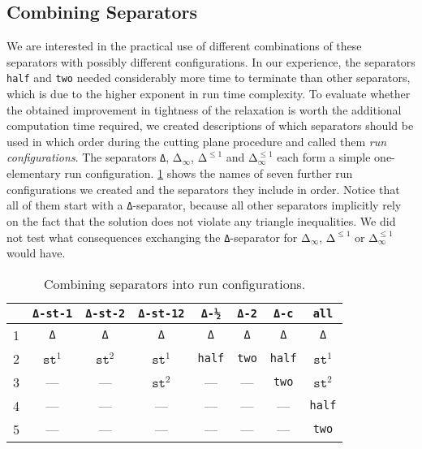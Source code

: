\subsection{Combining Separators}\label{subsec:run_configurations}
We are interested in the practical use of different combinations of these separators with possibly different configurations.
In our experience, the separators \texttt{half} and \texttt{two} needed considerably more time to terminate than other separators, which is due to the higher exponent in run time complexity.
To evaluate whether the obtained improvement in tightness of the relaxation is worth the additional computation time required,
we created descriptions of which separators should be used in which order during the cutting plane procedure and called them \textit{run configurations}.
The separators \texttt{Δ}, $\texttt{Δ}_{\infty}$, $\texttt{Δ}^{\leq 1}$ and $\texttt{Δ}_{\infty}^{\leq 1}$ each form a simple one-elementary run configuration.
\cref{tab:run_configurations} shows the names of seven further run configurations we created and the separators they include in order.
Notice that all of them start with a \texttt{Δ}-separator, because all other separators implicitly rely on the fact that the solution does not violate any triangle inequalities.
We did not test what consequences exchanging the \texttt{Δ}-separator for $\texttt{Δ}_{\infty}$, $\texttt{Δ}^{\leq 1}$ or $\texttt{Δ}_{\infty}^{\leq 1}$ would have.
\begin{table}
\centering
\begin{tabular}{lccccccc}
\toprule
  & \texttt{Δ-st-1} & \texttt{Δ-st-2} & \texttt{Δ-st-12}	& \texttt{Δ-½}	& \texttt{Δ-2} 	& \texttt{Δ-c}	& \texttt{all}  	\\
\midrule
1 & \texttt{Δ}      & \texttt{Δ}      & \texttt{Δ}      	& \texttt{Δ}	& \texttt{Δ}	& \texttt{Δ}	& \texttt{Δ} 		\\
2 & $\texttt{st}^1$ & $\texttt{st}^2$ & $\texttt{st}^1$ 	& \texttt{half}	& \texttt{two} 	& \texttt{half}	& $\texttt{st}^1$  	\\
3 & —               & —               & $\texttt{st}^2$ 	& —    			& —   		   	& \texttt{two}  & $\texttt{st}^2$  	\\
4 & —               & —               & —               	& —    			& —   		   	& —      		& \texttt{half}     \\
5 & —               & —               & —               	& —    			& — 			& —      		& \texttt{two}      \\
\bottomrule
\end{tabular}
\caption{Combining separators into run configurations.}
\label{tab:run_configurations}
\end{table}

